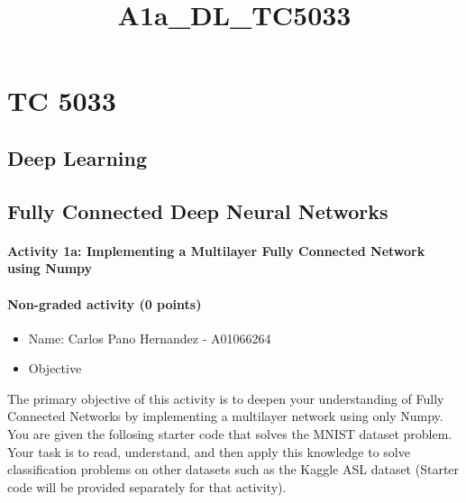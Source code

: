 \documentclass[11pt]{article}
\title{A1a\_DL\_TC5033}
\begin{document}
    
    \maketitle
    
    

    
    \hypertarget{tc-5033}{%
\section{TC 5033}\label{tc-5033}}

\hypertarget{deep-learning}{%
\subsection{Deep Learning}\label{deep-learning}}

\hypertarget{fully-connected-deep-neural-networks}{%
\subsection{Fully Connected Deep Neural
Networks}\label{fully-connected-deep-neural-networks}}

    \hypertarget{activity-1a-implementing-a-multilayer-fully-connected-network-using-numpy}{%
\paragraph{Activity 1a: Implementing a Multilayer Fully Connected
Network using
Numpy}\label{activity-1a-implementing-a-multilayer-fully-connected-network-using-numpy}}

\hypertarget{non-graded-activity-0-points}{%
\paragraph{Non-graded activity (0
points)}\label{non-graded-activity-0-points}}

\begin{itemize}
\item
  Name: Carlos Pano Hernandez - A01066264
\item
  Objective
\end{itemize}

The primary objective of this activity is to deepen your understanding
of Fully Connected Networks by implementing a multilayer network using
only Numpy. You are given the follosing starter code that solves the
MNIST dataset problem. Your task is to read, understand, and then apply
this knowledge to solve classification problems on other datasets such
as the Kaggle ASL dataset (Starter code will be provided separately for
that activity).
\end{document}
